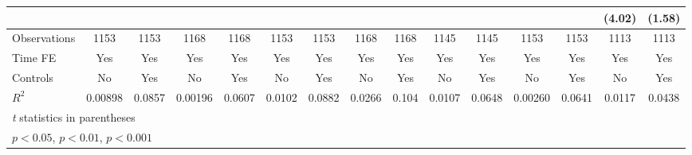 {\begin{tabular}{l*{14}{c}}
                &                  &                  &                  &                  &                  &                  &                  &                  &                  &                  &                  &                  &   (4.02)         &   (1.58)         \\
\hline
Observations    &     1153         &     1153         &     1168         &     1168         &     1153         &     1153         &     1168         &     1168         &     1145         &     1145         &     1153         &     1153         &     1113         &     1113         \\
Time FE         &      Yes         &      Yes         &      Yes         &      Yes         &      Yes         &      Yes         &      Yes         &      Yes         &      Yes         &      Yes         &      Yes         &      Yes         &      Yes         &      Yes         \\
Controls        &       No         &      Yes         &       No         &      Yes         &       No         &      Yes         &       No         &      Yes         &       No         &      Yes         &       No         &      Yes         &       No         &      Yes         \\
$ R^2 $         &  0.00898         &   0.0857         &  0.00196         &   0.0607         &   0.0102         &   0.0882         &   0.0266         &    0.104         &   0.0107         &   0.0648         &  0.00260         &   0.0641         &   0.0117         &   0.0438         \\
\hline\hline
\multicolumn{15}{l}{\footnotesize \textit{t} statistics in parentheses}\\
\multicolumn{15}{l}{\footnotesize \sym{*} \(p<0.05\), \sym{**} \(p<0.01\), \sym{***} \(p<0.001\)}\\
\end{tabular}
}
